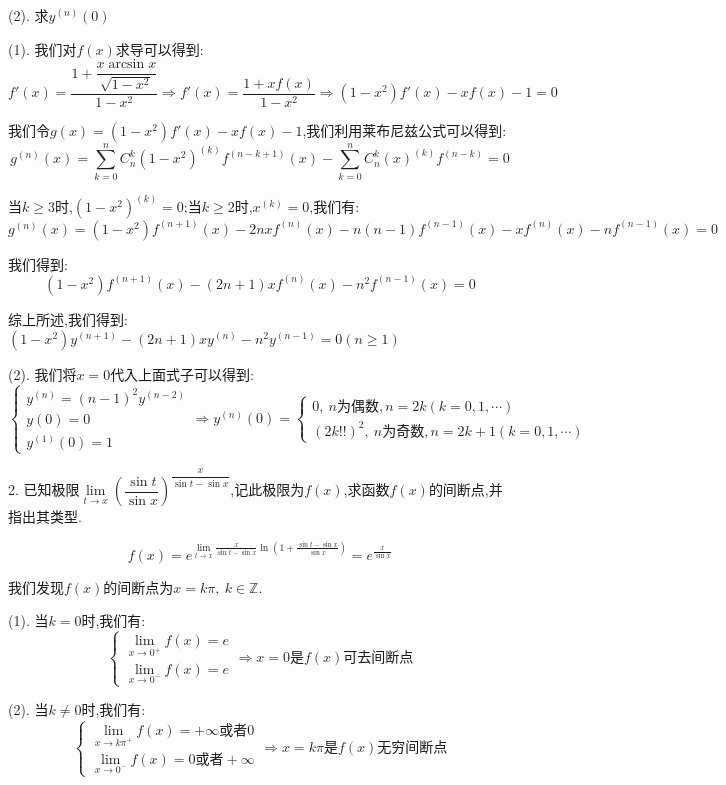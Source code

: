 (2). 求$y^{(n)}(0)$
\begin{solution}

	(1). 我们对$f(x)$求导可以得到:  
	$$f'(x)=\dfrac{1+\dfrac{x\arcsin x}{\sqrt{1-x^2}}}{1-x^2}\Rightarrow f'(x)=\dfrac{1+xf(x)}{1-x^2}\Rightarrow (1-x^2)f'(x)-xf(x)-1=0$$
	
	我们令$g(x)=(1-x^2)f'(x)-xf(x)-1$,我们利用莱布尼兹公式可以得到:  
	$$g^{(n)}(x)=\sum\limits_{k=0}^{n}C_{n}^{k}(1-x^2)^{(k)}f^{(n-k+1)}(x)-\sum\limits_{k=0}^{n}C_{n}^{k}(x)^{(k)}f^{(n-k)}=0$$
	
	当$k\geq 3$时,$(1-x^2)^{(k)}=0$;当$k\geq 2$时,$x^{(k)}=0$,我们有:  
	$$g^{(n)}(x)=(1-x^2)f^{(n+1)}(x)-2nxf^{(n)}(x)-n(n-1)f^{(n-1)}(x)-xf^{(n)}(x)-nf^{(n-1)}(x)=0$$
	
	我们得到:  
	$$(1-x^2)f^{(n+1)}(x)-(2n+1)xf^{(n)}(x)-n^2f^{(n-1)}(x)=0$$
	
	综上所述,我们得到:  $(1-x^2)y^{(n+1)}-(2n+1)xy^{(n)}-n^2y^{(n-1)}=0(n\geq 1)$
	
	(2). 我们将$x=0$代入上面式子可以得到:  
	$$\left\lbrace 
	\begin{array}{l}
		y^{(n)}=(n-1)^2y^{(n-2)}\\
		y(0)=0\\
		y^{(1)}(0)=1
	\end{array}
	\right. \Rightarrow y^{(n)}(0)=\left\lbrace 
	\begin{array}{l}
		0,\ n\text{为偶数},n=2k(k=0,1,\cdots)\\
		(2k!!)^2,\ n\text{为奇数},n=2k+1(k=0,1,\cdots)
	\end{array}
	\right. $$
\end{solution}

2. 已知极限$\lim\limits_{t\rightarrow x}\left(\dfrac{\sin t}{\sin x} \right)^{\dfrac{x}{\sin t-\sin x}}$,记此极限为$f(x)$,求函数$f(x)$的间断点,并指出其类型.
\begin{solution}

	$$f(x)=e^{\lim\limits_{t\rightarrow x}\frac{x}{\sin t-\sin x}\ln(1+\frac{\sin t-\sin x}{\sin x})}=e^{\frac{x}{\sin x}}$$
	
	我们发现$f(x)$的间断点为$x=k\pi,\ k\in\mathbb{Z}$.
	
	(1). 当$k=0$时,我们有:
	$$\left\lbrace 
	\begin{array}{l}
		\lim\limits_{x\rightarrow 0^{+}}f(x)=e\\
		\lim\limits_{x\rightarrow 0^{-}}f(x)=e
	\end{array}
	\right. \Rightarrow x=0\text{是}f(x)\text{可去间断点}$$
	
	(2). 当$k\neq 0$时,我们有:
	$$\left\lbrace 
	\begin{array}{l}
		\lim\limits_{x\rightarrow k\pi^{+}}f(x)=+\infty\text{或者}0\\
		\lim\limits_{x\rightarrow 0^{-}}f(x)=0\text{或者}+\infty
	\end{array}
	\right. \Rightarrow x=k\pi\text{是}f(x)\text{无穷间断点}$$
\end{solution}

